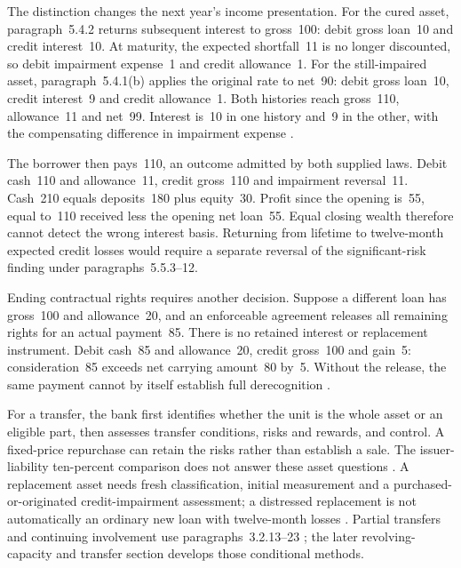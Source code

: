 The distinction changes the next year's income presentation. For the cured
asset, paragraph~5.4.2 returns subsequent interest to gross~100: debit gross
loan~10 and credit interest~10. At maturity, the expected shortfall~11 is no
longer discounted, so debit impairment expense~1 and credit allowance~1.
For the still-impaired asset, paragraph~5.4.1(b) applies the original rate to
net~90: debit gross loan~10, credit interest~9 and credit allowance~1.
Both histories reach gross~110, allowance~11 and net~99. Interest is~10 in one
history and~9 in the other, with the compensating difference in impairment
expense \citep[paragraphs~5.4.1--2]{aasb9dated}.

The borrower then pays~110, an outcome admitted by both supplied laws.
Debit cash~110 and allowance~11, credit gross~110 and impairment reversal~11.
Cash~210 equals deposits~180 plus equity~30. Profit since the opening is~55,
equal to~110 received less the opening net loan~55. Equal closing wealth
therefore cannot detect the wrong interest basis. Returning from lifetime
to twelve-month expected credit losses would require a separate reversal of
the significant-risk finding under paragraphs~5.5.3--12.

Ending contractual rights requires another decision. Suppose a different
loan has gross~100 and allowance~20, and an enforceable agreement releases
all remaining rights for an actual payment~85. There is no retained interest
or replacement instrument. Debit cash~85 and allowance~20, credit gross~100
and gain~5: consideration~85 exceeds net carrying amount~80 by~5.
Without the release, the same payment cannot by itself establish full
derecognition \citep[paragraphs~3.2.3 and~3.2.12]{aasb9dated}.

For a transfer, the bank first identifies whether the unit is the whole
asset or an eligible part, then assesses transfer conditions, risks and
rewards, and control. A fixed-price repurchase can retain the risks rather
than establish a sale. The issuer-liability ten-percent comparison does not
answer these asset questions \citep[paragraphs~3.2.2--7]{aasb9dated}.
A replacement asset needs fresh classification, initial measurement and a
purchased-or-originated credit-impairment assessment; a distressed replacement
is not automatically an ordinary new loan with twelve-month losses
\citep[B5.5.25--26]{aasb9dated}. Partial transfers and continuing involvement
use paragraphs~3.2.13--23 \citep[3.2.13--23]{aasb9dated}; the later
revolving-capacity and transfer section develops those conditional methods.

